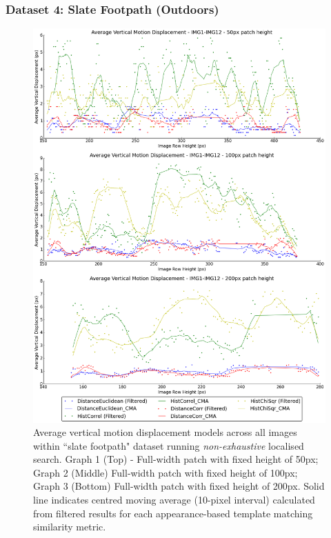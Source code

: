 \clearpage
\subsubsection{Dataset 4: Slate Footpath (Outdoors)}

\begin{figure}[ht!]
\centering
\includegraphics[scale=0.3]{images/results/path_outside_10cm_non_scaled}
\caption{Average vertical motion displacement models across all images within ``slate footpath" dataset running \textit{non-exhaustive} localised search. Graph 1 (Top) - Full-width patch with fixed height of 50px; Graph 2 (Middle) Full-width patch with fixed height of 100px; Graph 3 (Bottom) Full-width patch with fixed height of 200px. Solid line indicates centred moving average (10-pixel interval) calculated from filtered results for each appearance-based template matching similarity metric.}
\label{fig:ex2_4_1}
\end{figure}

